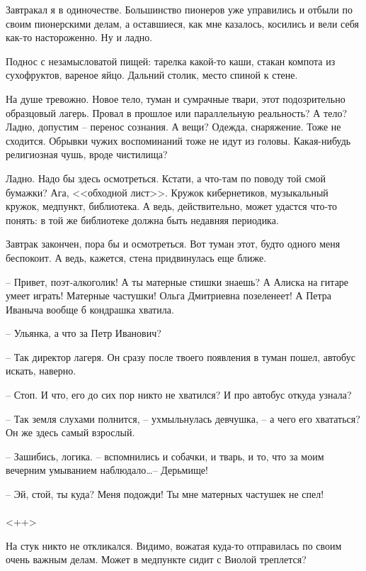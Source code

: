 \documentclass[a4paper]{book}
\begin{document}
Завтракал я в одиночестве. Большинство пионеров уже управились и отбыли по своим пионерскими делам, а оставшиеся, как мне казалось, косились и вели себя как-то настороженно. Ну и ладно. 

Поднос с незамысловатой пищей: тарелка какой-то каши, стакан компота из сухофруктов, вареное яйцо. Дальний столик, место спиной к стене. 

На душе тревожно. Новое тело, туман и сумрачные твари, этот подозрительно образцовый лагерь. Провал в прошлое или параллельную реальность? А тело? Ладно, допустим -- перенос сознания. А вещи? Одежда, снаряжение. Тоже не сходится. Обрывки чужих воспоминаний тоже не идут из головы. Какая-нибудь религиозная чушь, вроде чистилища? 

Ладно. Надо бы здесь осмотреться. Кстати, а что-там по поводу той смой бумажки? Ага, <<обходной лист>>. Кружок кибернетиков, музыкальный кружок, медпункт, библиотека. А ведь, действительно, может удастся что-то понять: в той же библиотеке должна быть недавняя периодика. 

Завтрак закончен, пора бы и осмотреться. Вот туман этот, будто одного меня беспокоит. А ведь, кажется, стена придвинулась еще ближе.

-- Привет, поэт-алкоголик! А ты матерные стишки знаешь? А Алиска на гитаре умеет играть! Матерные частушки! Ольга Дмитриевна позеленеет! А Петра Иваныча вообще б кондрашка хватила.

-- Ульянка, а что за Петр Иванович? 

-- Так директор лагеря. Он сразу после твоего появления в туман пошел, автобус искать, наверно. 

-- Стоп. И что, его до сих пор никто не хватился? И про автобус откуда узнала?

-- Так земля слухами полнится, -- ухмыльнулась девчушка, -- а чего его хвататься? Он же здесь самый взрослый.

-- Зашибись, логика. -- вспомнились и собачки, и тварь, и то, что за моим вечерним умыванием наблюдало\ldots -- Дерьмище!

-- Эй, стой, ты куда? Меня подожди! Ты мне матерных частушек не спел!
\\
\paragraph{}<++>

На стук никто не откликался. Видимо, вожатая куда-то отправилась по своим очень важным делам. Может в медпункте сидит с Виолой треплется?
\end{document}
